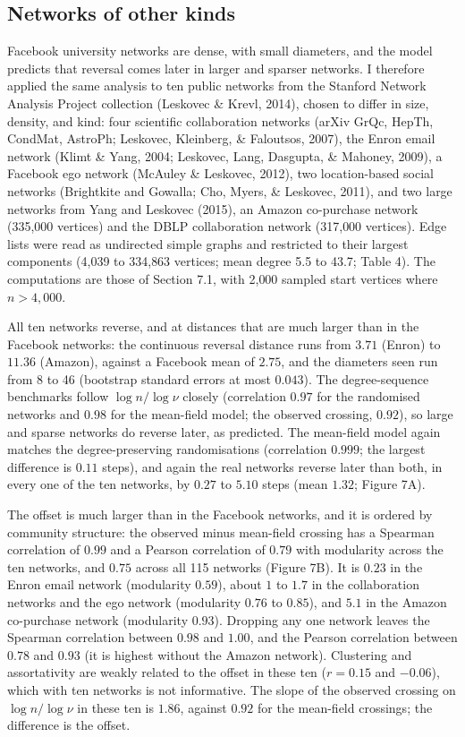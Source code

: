 \documentclass{nws}
\begin{document}
\subsection{Networks of other kinds}

Facebook university networks are dense, with small diameters, and the model predicts
that reversal comes later in larger and sparser networks. I therefore applied the
same analysis to ten public networks from the Stanford Network Analysis Project
collection (Leskovec \& Krevl, 2014), chosen to differ in size, density, and kind:
four scientific collaboration networks (arXiv GrQc, HepTh, CondMat, AstroPh;
Leskovec, Kleinberg, \& Faloutsos, 2007), the Enron email network (Klimt \& Yang, 2004; Leskovec, Lang, Dasgupta, \& Mahoney, 2009), a Facebook ego
network (McAuley \& Leskovec, 2012), two location-based social networks (Brightkite
and Gowalla; Cho, Myers, \& Leskovec, 2011), and two large networks from
Yang and Leskovec (2015), an Amazon co-purchase network (335{,}000 vertices) and the
DBLP collaboration network (317{,}000 vertices). Edge lists were read as undirected
simple graphs and restricted to their largest components (4{,}039 to 334{,}863
vertices; mean degree 5.5 to 43.7; Table 4). The computations are those of
Section 7.1, with 2{,}000 sampled start vertices where $n>4{,}000$.

All ten networks reverse, and at distances that are much larger than in the Facebook
networks: the continuous reversal distance runs from $3.71$ (Enron) to $11.36$
(Amazon), against a Facebook mean of $2.75$, and the diameters seen run from 8 to 46
(bootstrap standard errors at most $0.043$). The degree-sequence benchmarks
follow $\log n/\log\nu$ closely (correlation $0.97$ for the randomised networks and
$0.98$ for the mean-field model; the observed crossing, $0.92$), so large and sparse
networks do reverse later, as predicted. The mean-field model again matches the
degree-preserving randomisations (correlation $0.999$; the largest difference is $0.11$
steps), and again the real networks reverse later than both, in every one of the ten
networks, by $0.27$ to $5.10$ steps (mean $1.32$; Figure 7A).

The offset is much larger
than in the Facebook networks, and it is ordered by community structure: the
observed minus mean-field crossing has a Spearman correlation of $0.99$ and a
Pearson correlation of $0.79$ with modularity across the ten networks, and $0.75$ across
all 115 networks (Figure 7B). It is $0.23$ in the Enron email network (modularity $0.59$),
about $1$ to $1.7$ in the collaboration networks and the ego network (modularity $0.76$ to $0.85$),
and $5.1$ in the Amazon co-purchase network (modularity $0.93$). Dropping any one network leaves the Spearman correlation between $0.98$ and $1.00$, and the Pearson correlation between $0.78$ and $0.93$ (it is highest without the Amazon network). Clustering and assortativity
are weakly related to the offset in these ten ($r=0.15$ and $-0.06$), which with ten networks is not informative. The slope of the observed crossing on $\log n/\log\nu$ in these ten is $1.86$, against $0.92$ for the mean-field crossings; the difference is the offset.
\end{document}
